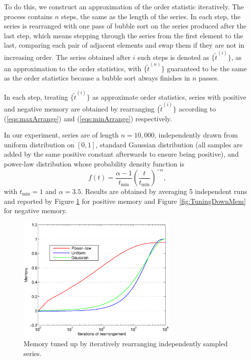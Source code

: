 To do this, we construct an approximation of the order statistic iteratively. The process contains $ n $ steps, the same as the length of the series. In each step, the series is rearranged with one pass of bubble sort on the series produced after the last step, which means stepping through the series from the first element to the last, comparing each pair of adjacent elements and swap them if they are not in increasing order. The series obtained after $ i $ such steps is denoted as $ \{ \tilde{t}^{(i)} \} $, as an approximation to the order statistics, with $ \{ \tilde{t}^{(n)} \} $ guaranteed to be the same as the order statistics because a bubble sort always finishes in $ n $ passes.

In each step, treating $ \{ \tilde{t}^{(i)} \} $ as approximate order statistics, series with positive and negative memory are obtained by rearranging $ \{ \tilde{t}^{(i)} \} $  according to (\ref{eqs:maxArrange}) and (\ref{eqs:minArrange}) respectively.

In our experiment, series are of length $ n=10,000 $, independently drawn from uniform distribution on $ [0,1] $, standard Gaussian distribution (all samples are added by the same positive constant afterwards to ensure being positive), and power-law distribution whose probability density function is
\begin{equation}
	f(t) = \frac{\alpha-1}{t_{\min}} (\frac{t}{t_{\min}})^{-\alpha},
\end{equation}
with $ t_{\min}=1 $ and $ \alpha=3.5 $.
Results are obtained by averaging 5 independent runs and reported by Figure \ref{fig:TuningUpMem} for positive memory and Figure \ref{fig:TuningDownMem} for negative memory.

\begin{figure}[!ht]
\centering
\includegraphics[width=0.7\textwidth]{figures/TuningUp-power-uni-gauss.eps}
\caption{Memory tuned up by iteratively rearranging independently sampled series.}
\label{fig:TuningUpMem}
\end{figure}

